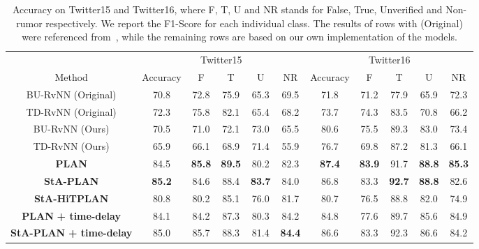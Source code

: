 \documentclass[letterpaper]{article} %
\begin{document}
\begin{table}[ht]
\small
\centering
\begin{tabular}{ccccccccccc} \toprule
& \multicolumn{5}{c}{Twitter15} & \multicolumn{5}{c}{Twitter16} \\
Method		&	Accuracy & F & T & U & NR & Accuracy & F & T & U & NR \\ \midrule
BU-RvNN	(Original) & 70.8 & 72.8 & 75.9 & 65.3 & 69.5
& 71.8 & 71.2 & 77.9 & 65.9 & 72.3\\
TD-RvNN (Original) & 72.3 & 75.8 & 82.1 & 65.4 & 68.2 
& 73.7 & 74.3 & 83.5 & 70.8 & 66.2 \\
BU-RvNN (Ours)	& 70.5 & 71.0 & 72.1 & 73.0 & 65.5 
& 80.6 & 75.5 & 89.3 & 83.0 & 73.4\\
TD-RvNN	(Ours) & 65.9 & 66.1 & 68.9 & 71.4 & 55.9 
& 76.7 & 69.8 & 87.2 & 81.3 & 66.1 \\
\midrule
\textbf{PLAN}	& 84.5 & \textbf{85.8} & \textbf{89.5} & 80.2 & 82.3 
 & \textbf{87.4} & \textbf{83.9} & 91.7 & \textbf{88.8} & \textbf{85.3} \\
\textbf{StA-PLAN} & \textbf{85.2} & 84.6 & 88.4 & \textbf{83.7} & 84.0
& 86.8 & 83.3 & \textbf{92.7} & \textbf{88.8} & 82.6\\
\textbf{StA-HiTPLAN} & 80.8 & 80.2 & 85.1 & 76.0 & 81.7 
& 80.7 & 76.5 & 88.8 & 82.0 & 74.9 \\
\textbf{PLAN} \textbf{+ time-delay}	& 84.1 & 84.2 & 87.3 & 80.3 & 84.2
& 84.8 & 77.6 & 89.7 & 85.6 & 84.9\\
\textbf{StA-PLAN} \textbf{+ time-delay} & 85.0 & 85.7 & 88.3 & 81.4 & \textbf{84.4}
 & 86.6 & 83.3 & 92.3 & 86.6 & 84.2 \\
\bottomrule 
\end{tabular}
\caption{Accuracy on Twitter15 and Twitter16, where F, T, U and NR stands for False, True, Unverified and Non-rumor respectively. We report the F1-Score for each individual class. The results of rows with (Original) were referenced from~\cite{ma17}, while the remaining rows are based on our own implementation of the models.} 
\label{tab:results_15}
\end{table}
\end{document}
